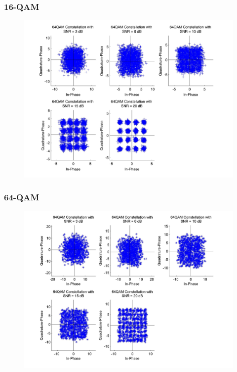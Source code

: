 \documentclass[]{article}
\begin{document}
\subsubsection{16-QAM}
\begin{figure}[H]
\centering
\hspace*{-2cm}\includegraphics[width=1.3\textwidth]{qam16Const.jpg}
\caption{}
\end{figure}
\subsubsection{64-QAM}
\begin{figure}[H]
\centering
\hspace*{-2cm}\includegraphics[width=1.3\textwidth]{qam64Const.jpg}
\caption{}
\end{figure}
\end{document}
